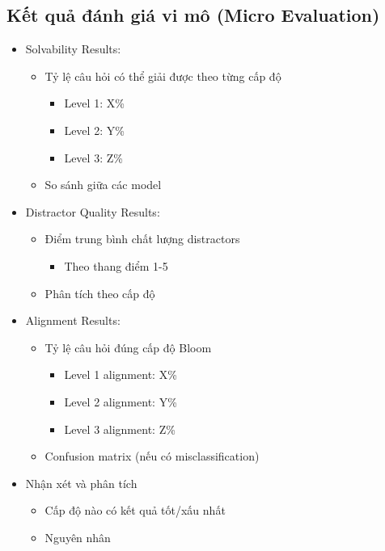 \subsection{Kết quả đánh giá vi mô (Micro Evaluation)}
\begin{itemize}
    \item Solvability Results:
    \begin{itemize}
        \item Tỷ lệ câu hỏi có thể giải được theo từng cấp độ
        \begin{itemize}
            \item Level 1: X\%
            \item Level 2: Y\%
            \item Level 3: Z\%
        \end{itemize}
        \item So sánh giữa các model
    \end{itemize}
    \item Distractor Quality Results:
    \begin{itemize}
        \item Điểm trung bình chất lượng distractors
        \begin{itemize}
            \item Theo thang điểm 1-5
        \end{itemize}
        \item Phân tích theo cấp độ
    \end{itemize}
    \item Alignment Results:
    \begin{itemize}
        \item Tỷ lệ câu hỏi đúng cấp độ Bloom
        \begin{itemize}
            \item Level 1 alignment: X\%
            \item Level 2 alignment: Y\%
            \item Level 3 alignment: Z\%
        \end{itemize}
        \item Confusion matrix (nếu có misclassification)
    \end{itemize}
    \item Nhận xét và phân tích
    \begin{itemize}
        \item Cấp độ nào có kết quả tốt/xấu nhất
        \item Nguyên nhân
    \end{itemize}
\end{itemize}

